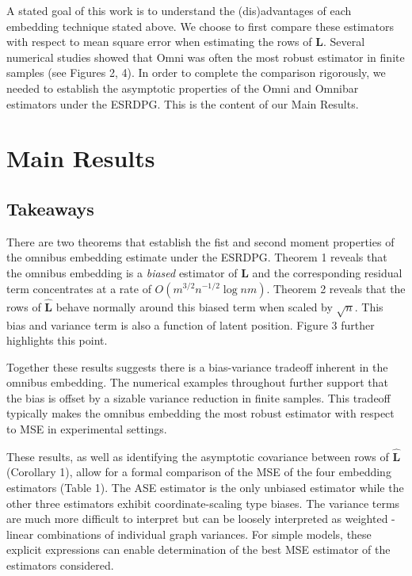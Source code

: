 \documentclass{article}
\newcommand{\bvar}[1]{\mathbf{#1}}
\theoremstyle{definition}
\numberwithin{Def}{section}
\begin{document}
A stated goal of this work is to understand the (dis)advantages of each embedding technique stated above. 
We choose to first compare these estimators with respect to mean square error when estimating the rows of $\bvar{L}$. 
Several numerical studies showed that Omni was often the most robust estimator in finite samples (see Figures 2, 4). 
In order to complete the comparison rigorously, we needed to establish the asymptotic properties of the Omni and Omnibar estimators under the ESRDPG. 
This is the content of our Main Results.

\section{Main Results}

\subsection{Takeaways}

There are two theorems that establish the fist and second moment properties of the omnibus embedding estimate under the ESRDPG. 
Theorem 1 reveals that the omnibus embedding is a \textit{biased} estimator of $\bvar{L}$ and the corresponding residual term concentrates at a rate of $O(m^{3/2}n^{-1/2}\log nm)$. 
Theorem 2 reveals that the rows of $\hat{\bvar{L}}$ behave normally around this biased term when scaled by $\sqrt{n}$. 
This bias and variance term is also a function of  latent position. 
Figure 3 further highlights this point. 


Together these results suggests there is a bias-variance tradeoff inherent in the omnibus embedding.
The numerical examples throughout further support that the bias is offset by a sizable variance reduction in finite samples. 
This tradeoff typically makes the omnibus embedding the most robust estimator with respect to MSE in experimental settings. 

These results, as well as identifying the asymptotic covariance between rows of $\hat{\bvar{L}}$ (Corollary 1), allow for a formal comparison of the MSE of the four embedding estimators (Table 1). 
The ASE estimator is the only unbiased estimator while the other three estimators exhibit coordinate-scaling type biases. 
The variance terms are much more difficult to interpret but can be loosely interpreted as weighted - linear combinations of individual graph variances.  
For simple models, these explicit expressions can enable determination of the best MSE estimator of the estimators considered. 
\end{document}
